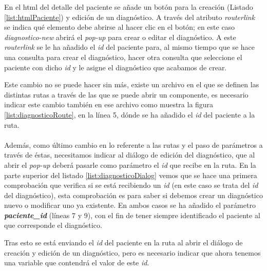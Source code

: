 

En el html del detalle del paciente se añade un botón para la creación (Listado \ref{list:htmlPaciente}) y edición de un diagnóstico. A través del atributo \emph{routerlink} se indica qué elemento debe abrirse al hacer clic en el botón; en este caso \emph{diagnostico-new} abrirá el \emph{pop-up} para crear o editar el diagnóstico. A este \emph{routerlink} se le ha añadido el \emph{id} del paciente para, al mismo tiempo que se hace una consulta para crear el diagnóstico, hacer otra consulta que seleccione el paciente con dicho \emph{id} y le asigne el diagnóstico que acabamos de crear.

Este cambio no se puede hacer sin más, existe un archivo en el que se definen las distintas rutas a través de las que se puede abrir un componente, es necesario indicar este cambio también en ese archivo como muestra la figura \ref{list:diagnosticoRoute}, en la línea 5, dónde se ha añadido el \emph{id} del paciente a la ruta.
\\
\\


Además, como último cambio en lo referente a las rutas y el paso de parámetros a través de éstas, necesitamos indicar al diálogo de edición del diagnóstico, que al abrir el \emph{pop-up} deberá pasarle como parámetro el \emph{id} que recibe en la ruta. En la parte superior del listado \ref{list:diagnosticoDialog} vemos que se hace una primera comprobación que verifica si se está recibiendo un \emph{id} (en este caso se trata del \emph{id} del diagnóstico), esta comprobación es para saber si debemos crear un diagnóstico nuevo o modificar uno ya existente. En ambos casos se ha añadido el parámetro \textbf{\textit{paciente\_id}} (líneas 7 y 9), con el fin de tener siempre identificado el paciente al que corresponde el diagnóstico.



Tras esto se está enviando el \emph{id} del paciente en la ruta al abrir el diálogo de creación y edición de un diagnóstico, pero es necesario indicar que ahora tenemos una variable que contendrá el valor de este \emph{id}. 

